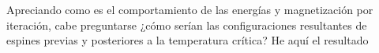 \documentclass[11pt,a4paper]{article}
\begin{document}
\newpage
Apreciando como es el comportamiento de las energías y magnetización por iteración, cabe preguntarse ¿cómo serían las configuraciones resultantes de espines previas y posteriores a la temperatura crítica? He aquí el resultado
\begin{figure}[h!]
\centering
{}
\\

\end{figure}
\end{document}
